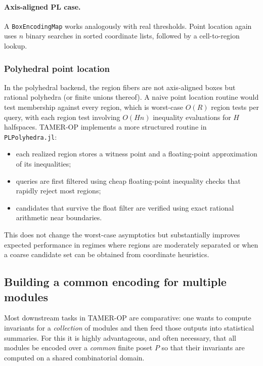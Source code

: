 \documentclass{article}
\newcommand{\<}{\langle}
\renewcommand{\>}{\rangle}
\theoremstyle{definition}
\theoremstyle{remark}
\begin{document}
	\paragraph{Axis-aligned PL case.}
	A \texttt{BoxEncodingMap} works analogously with real thresholds.  Point location
	again uses $n$ binary searches in sorted coordinate lists, followed by a cell-to-region
	lookup.
	
	\subsubsection*{Polyhedral point location}
	
	In the polyhedral backend, the region fibers are not axis-aligned boxes but rational
	polyhedra (or finite unions thereof).  A naive point location routine would test
	membership against every region, which is worst-case $O(R)$ region tests per query,
	with each region test involving $O(Hn)$ inequality evaluations for $H$ halfspaces.
	TAMER-OP implements a more structured routine in \texttt{PLPolyhedra.jl}:
	\begin{itemize}
		\item each realized region stores a witness point and a floating-point approximation
		of its inequalities;
		\item queries are first filtered using cheap floating-point inequality checks that
		rapidly reject most regions;
		\item candidates that survive the float filter are verified using exact rational
		arithmetic near boundaries.
	\end{itemize}
	This does not change the worst-case asymptotics but substantially improves expected
	performance in regimes where regions are moderately separated or when a coarse
	candidate set can be obtained from coordinate heuristics.
	
	\subsection{Building a common encoding for multiple modules}
	\label{subsec:common-encoding}
	
	Most downstream tasks in TAMER-OP are comparative: one wants to compute invariants
	for a \emph{collection} of modules and then feed those outputs into statistical
	summaries.  For this it is highly advantageous, and often necessary, that all modules
	be encoded over a \emph{common} finite poset $P$ so that their invariants are computed
	on a shared combinatorial domain.
	
\end{document}
